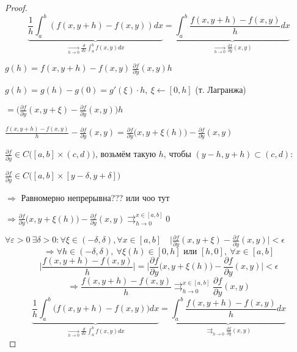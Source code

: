     \begin{proof}
        \[
            \underbrace{\frac{1}{h} \int_a^b (f(x, y+h) - f(x, y)) dx}_{\xrightarrow[h \rightarrow 0]{} \frac{d}{dx}\int_a^b f(x, y) dx} = \underbrace{\int_a^b \frac{f(x, y + h) - f(x, y)}{h} dx}_{\xrightarrow[h \rightarrow 0]{} \frac{\partial f}{\partial y}(x, y)}   
        \] %
        \par $g(h) = f(x, y+h) - f(x, y) \ \frac{\partial f}{\partial y}(x, y) h$
        \par $g(h) = g(h) - g(0) = g'(\xi)\cdot h, \ \xi \leftarrow [0, h]$ \quad (т. Лагранжа)
        \par $= \Big(\frac{\partial f}{\partial y}(x, y + \xi) - \frac{\partial f}{\partial y}(x, y)\Big)h$
        \par $\frac{f(x, y+h) - f(x, y)}{h} - \frac{\partial f}{\partial y}(x, y) = \frac{\partial f}{\partial y}\big(x, y + \xi(h)\big) - \frac{\partial f}{\partial y}(x, y)$
        \par $\frac{\partial f}{\partial y} \in C\big([a, b] \times (c, d)\big)$, возьмём такую $h$, чтобы $(y-h, y+h) \subset (c,d):$
        \par $\frac{\partial f}{\partial y} \in C\big([a, b] \times [y - \delta, y + \delta]\big)$
        \par $\Rightarrow$ Равномерно непрерывна??? или чоо тут
        \par $\Rightarrow \frac{\partial f}{\partial y} \big(x, y + \xi(h)\big) - \frac{\partial f}{\partial y}(x, y) \rightrightarrows_{h \rightarrow 0}^{x \in [a, b] } 0$ 
        \par $\forall \varepsilon > 0 \ \exists \delta > 0: \forall \xi \in (-\delta, \delta), \forall x \in [a,b] \quad \Big|\frac{\partial f}{\partial y}(x, y + \xi) - \frac{\partial f}{\partial y}(x, y)\Big| < \epsilon$
        \[
            \Rightarrow \forall h \in (-\delta, \delta), \ \forall \xi(h) \in [0, h] \text{ или } [h, 0], \ \forall x \in [a, b]    
        \]
        \[
            \Big|\frac{f(x, y + h) - f(x, y)}{h}\Big| = \Big|\frac{\partial f}{\partial y}\big(x, y + \xi(h)\big) - \frac{\partial f}{\partial y}(x, y)\Big| < \epsilon    
        \]
        \[
            \Rightarrow \frac{f(x, y+h) - f(x, y)}{h} \rightrightarrows_{h \rightarrow 0}^{x \in [a, b]} \frac{\partial f}{\partial y}(x, y)    
        \]
        \[
            \underbrace{\frac{1}{h} \int_a^b \big(f(x, y+h) - f(x, y)\big) dx}_{\xrightarrow[h \rightarrow 0]{} \frac{d}{dx}\int_a^b f(x, y) dx} = \underbrace{\int_a^b \frac{f(x, y + h) - f(x, y)}{h} dx}_{\rightrightarrows_{h \rightarrow 0}{} \frac{\partial f}{\partial y}(x, y)} %
        \] %
    \end{proof}

